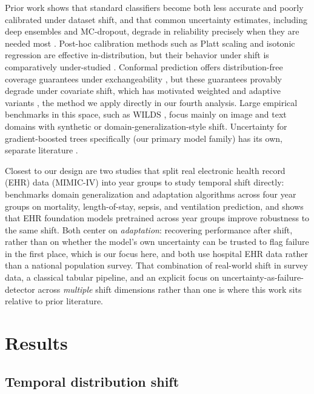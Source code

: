 \documentclass[12pt]{article}
\begin{document}
Prior work shows that standard classifiers become both less accurate and poorly calibrated under dataset shift, and that common uncertainty estimates, including deep ensembles and MC-dropout, degrade in reliability precisely when they are needed most \citep{ovadia2019trust,lakshminarayanan2017ensembles,gal2016dropout}. Post-hoc calibration methods such as Platt scaling and isotonic regression are effective in-distribution, but their behavior under shift is comparatively under-studied \citep{guo2017calibration,niculescu2005predicting}. Conformal prediction offers distribution-free coverage guarantees under exchangeability \citep{vovk2005algorithmic}, but these guarantees provably degrade under covariate shift, which has motivated weighted and adaptive variants \citep{tibshirani2019conformal}, the method we apply directly in our fourth analysis. Large empirical benchmarks in this space, such as WILDS \citep{koh2021wilds}, focus mainly on image and text domains with synthetic or domain-generalization-style shift. Uncertainty for gradient-boosted trees specifically (our primary model family) has its own, separate literature \citep{malinin2021uncertainty}.

Closest to our design are two studies that split real electronic health record (EHR) data (MIMIC-IV) into year groups to study temporal shift directly: \citet{guo2022evaluation} benchmarks domain generalization and adaptation algorithms across four year groups on mortality, length-of-stay, sepsis, and ventilation prediction, and \citet{guo2023ehr} shows that EHR foundation models pretrained across year groups improve robustness to the same shift. Both center on \emph{adaptation}: recovering performance after shift, rather than on whether the model's own uncertainty can be trusted to flag failure in the first place, which is our focus here, and both use hospital EHR data rather than a national population survey. That combination of real-world shift in survey data, a classical tabular pipeline, and an explicit focus on uncertainty-as-failure-detector across \emph{multiple} shift dimensions rather than one is where this work sits relative to prior literature.

\section{Results}

\subsection{Temporal distribution shift}
\label{sec:temporal}
\end{document}
